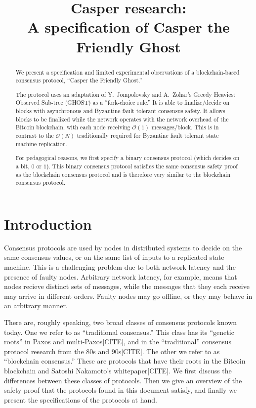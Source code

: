 \documentclass{article}
\theoremstyle{definition}
\begin{document}
\title{Casper research: \\ A specification of Casper the Friendly Ghost}
\maketitle

\begin{abstract}
We present a specification and limited experimental observations of a blockchain-based consensus protocol, ``Casper the Friendly Ghost.''

The protocol uses an adaptation of Y.\ Jompolovsky and A.\ Zohar's Greedy Heaviest Observed Sub-tree (GHOST) as a ``fork-choice rule.'' It is able to finalize/decide on blocks with asynchronous and Byzantine fault tolerant consensus safety. It allows blocks to be finalized while the network operates with the network overhead of the Bitcoin blockchain, with each node receiving $\mathcal{O}(1)$ messages/block. This is in contrast to the $\mathcal{O}(N)$ traditionally required for Byzantine fault tolerant state machine replication.

For pedagogical reasons, we first specify a binary consensus protocol (which decides on a bit, $0$ or $1$). This binary consensus protocol satisfies the same consensus safety proof as the blockchain consensus protocol and is therefore very similar to the blockchain consensus protocol.

\end{abstract}

\section{Introduction}

Consensus protocols are used by nodes in distributed systems to decide on the same consensus values, or on the same list of inputs to a replicated state machine. This is a challenging problem due to both network latency and the presence of faulty nodes. Arbitrary network latency, for example, means that nodes recieve distinct sets of messages, while the messages that they each receive may arrive in different orders. Faulty nodes may go offline, or they may behave in an arbitrary manner.

There are, roughly speaking, two broad classes of consensus protocols known today. One we refer to as ``traditional consensus.'' This class has its ``genetic roots'' in Paxos and multi-Paxos[CITE], and in the ``traditional'' consensus protocol research from the 80s and 90s[CITE]. The other we refer to as ``blockchain consensus.'' These are protocols that have their roots in the Bitcoin blockchain and Satoshi Nakamoto's whitepaper[CITE]. We first discuss the differences between these classes of protocols. Then we give an overview of the safety proof that the protocols found in this document satisfy, and finally we present the specifications of the protocols at hand.
\end{document}
